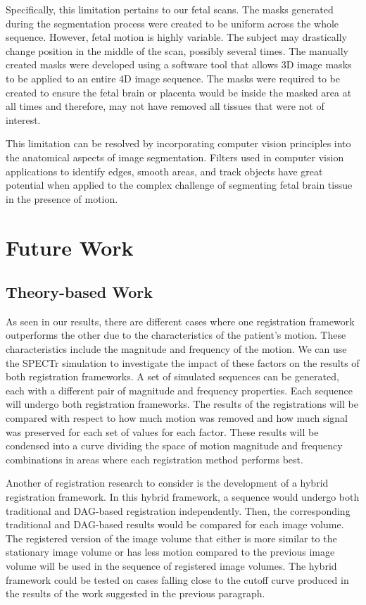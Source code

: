 Specifically, this limitation pertains to our fetal scans. The masks generated during the segmentation process were created to be uniform across the whole sequence. However, fetal motion is highly variable. The subject may drastically change position in the middle of the scan, possibly several times. The manually created masks were developed using a software tool that allows 3D image masks to be applied to an entire 4D image sequence. The masks were required to be created to ensure the fetal brain or placenta would be inside the masked area at all times and therefore, may not have removed all tissues that were not of interest.

This limitation can be resolved by incorporating computer vision principles into the anatomical aspects of image segmentation. Filters used in computer vision applications to identify edges, smooth areas, and track objects have great potential when applied to the complex challenge of segmenting fetal brain tissue in the presence of motion.

\section{Future Work}

\subsection{Theory-based Work}

As seen in our results, there are different cases where one registration framework outperforms the other due to the characteristics of the patient's motion. These characteristics include the magnitude and frequency of the motion. We can use the SPECTr simulation to investigate the impact of these factors on the results of both registration frameworks. A set of simulated sequences can be generated, each with a different pair of magnitude and frequency properties. Each sequence will undergo both registration frameworks. The results of the registrations will be compared with respect to how much motion was removed and how much signal was preserved for each set of values for each factor. These results will be condensed into a curve dividing the space of motion magnitude and frequency combinations in areas where each registration method performs best.

Another of registration research to consider is the development of a hybrid registration framework. In this hybrid framework, a sequence would undergo both traditional and DAG-based registration independently. Then, the corresponding traditional and DAG-based results would be compared for each image volume. The registered version of the image volume that either is more similar to the stationary image volume or has less motion compared to the previous image volume will be used in the sequence of registered image volumes. The hybrid framework could be tested on cases falling close to the cutoff curve produced in the results of the work suggested in the previous paragraph.

